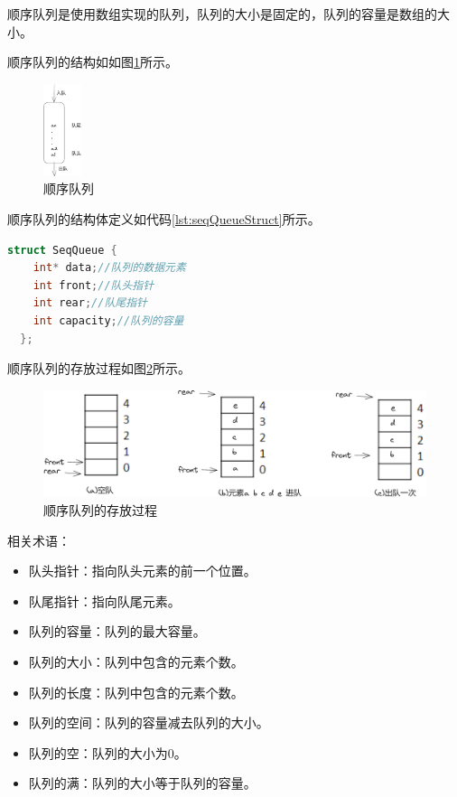 \documentclass[lang=cn,newtx,10pt,scheme=chinese]{../elegantbook}
\begin{document}
顺序队列是使用数组实现的队列，队列的大小是固定的，队列的容量是数组的大小。

顺序队列的结构如如图\ref{fig:seqQueue}所示。

\begin{figure}[!htbp]
  \centering
  \includegraphics[width=0.1\textwidth]{./figure/pdf/cropped/seqQueue.pdf}
  \caption{顺序队列}
  \label{fig:seqQueue}
\end{figure}

顺序队列的结构体定义如代码\ref{lst:seqQueueStruct}所示。

\begin{lstlisting}[language=C++, caption={顺序队列结构体定义}, label={lst:seqQueueStruct}]
  struct SeqQueue {
    int* data;//队列的数据元素
    int front;//队头指针
    int rear;//队尾指针
    int capacity;//队列的容量
  };
\end{lstlisting}


顺序队列的存放过程如图\ref{fig:seqQueuePut}所示。

\begin{figure}[!htbp]
  \centering
  \includegraphics[width=1\textwidth]{./figure/pdf/cropped/seqQueuePut.pdf}
  \caption{顺序队列的存放过程}
  \label{fig:seqQueuePut}
\end{figure}

相关术语：

\begin{itemize}
  \item 队头指针：指向队头元素的前一个位置。
  \item 队尾指针：指向队尾元素。
  \item 队列的容量：队列的最大容量。
  \item 队列的大小：队列中包含的元素个数。
  \item 队列的长度：队列中包含的元素个数。
  \item 队列的空间：队列的容量减去队列的大小。
  \item 队列的空：队列的大小为0。
  \item 队列的满：队列的大小等于队列的容量。
\end{itemize}
\end{document}
